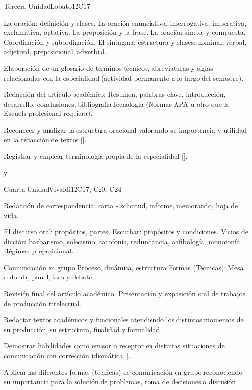 \begin{syllabus}
\begin{unit}{}{Tercera Unidad}{Lobato}{12}{C17}
\begin{topics}
   \item La oración: definición y clases. La oración enunciativa, interrogativa, imperativa, exclamativa, optativa. La proposición y la frase. La oración simple y compuesta. Coordinación y subordinación. El sintagma: estructura y clases: nominal, verbal, adjetival, preposicional, adverbial.
   \item Elaboración de un glosario de términos técnicos, abreviaturas y siglas relacionadas con la especialidad (actividad permanente a lo largo del semestre).
   \item Redacción del artículo académico: Resumen, palabras clave, introducción, desarrollo, conclusiones, bibliografiaTecnologia (Normas APA u otro que la Escuela profesional requiera).
\end{topics}
\begin{learningoutcomes}
   \item Reconocer y analizar  la estructura oracional valorando su importancia y utilidad en la redacción de textos [\Usage].
   \item Registrar y emplear terminología propia de la especialidad [\Usage].
\end{learningoutcomes}
\end{unit}
y
\begin{unit}{}{Cuarta Unidad}{Vivaldi}{12}{C17, C20, C24}
\begin{topics}
   \item Redacción de correspondencia: carta - solicitud, informe, memorando, hoja de vida.
   \item El discurso oral: propósitos, partes. Escuchar: propósitos y condiciones. Vicios de dicción: barbarismo, solecismo, cacofonía, redundancia, anfibología, monotonía. Régimen preposicional.
   \item Comunicación en grupo Proceso, dinámica, estructura Formas (Técnicas): Mesa redonda,  panel, foro y debate.
   \item Revisión final del artículo académico. Presentación y exposición oral de trabajos de producción intelectual.
\end{topics}
\begin{learningoutcomes}
   \item Redactar textos académicos y funcionales atendiendo los distintos momentos de su producción, su estructura, finalidad y formalidad [\Usage].
   \item Demostrar habilidades como emisor o receptor en distintas situaciones de comunicación con corrección idiomática [\Usage].
   \item Aplicar las diferentes formas (técnicas) de comunicación en grupo reconociendo su importancia para la solución de problemas, toma de decisiones o discusión [\Usage].
\end{learningoutcomes}
\end{unit}

\begin{coursebibliography}
\end{coursebibliography}

\end{syllabus}
